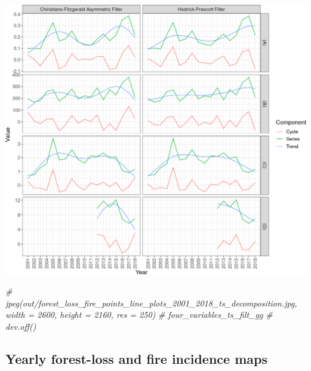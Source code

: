 \documentclass[10pt,landscape,a3paper]{article}
\newenvironment{Shaded}{\begin{snugshade}}{\end{snugshade}}
\newcommand{\CommentTok}[1]{\textcolor[rgb]{0.56,0.35,0.01}{\textit{#1}}}
\begin{document}
\begin{center}\includegraphics{img/modelling/aa-eda-ts-21} \end{center}

\begin{Shaded}
\begin{Highlighting}[]
\CommentTok{\# jpeg(\textquotesingle{}out/forest\_loss\_fire\_points\_line\_plots\_2001\_2018\_ts\_decomposition.jpg\textquotesingle{}, width = 2600, height = 2160, res = 250)}
\CommentTok{\# four\_variables\_ts\_filt\_gg}
\CommentTok{\# dev.off()}
\end{Highlighting}
\end{Shaded}

\hypertarget{yearly-forest-loss-and-fire-incidence-maps}{%
\subsection{Yearly forest-loss and fire incidence
maps}\label{yearly-forest-loss-and-fire-incidence-maps}}
\end{document}
